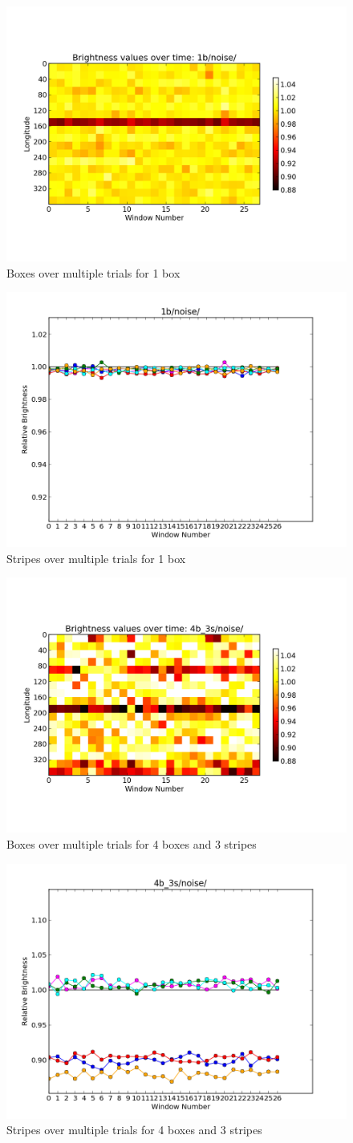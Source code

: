 \documentclass[iop]{emulateapj}
\begin{document}
\begin{figure}[h]
	\centering
	\includegraphics[width=.5\textwidth]{images/1b/noise/region_plot.png}
	\caption{Boxes over multiple trials for 1 box}
	\label{1b/noise}
\end{figure}
\begin{figure}[h]
	\centering
	\includegraphics[width=.5\textwidth]{images/1b/noise/stripes_over_time.png}
	\caption{Stripes over multiple trials for 1 box}
	\label{1b/noise/stripes}
\end{figure}

\begin{figure}[h]
	\centering
	\includegraphics[width=.5\textwidth]{images/4b_3s/noise/region_plot.png}
	\caption{Boxes over multiple trials for 4 boxes and 3 stripes}
	\label{4b_3s/noise}
\end{figure}
\begin{figure}[h]
	\centering
	\includegraphics[width=.5\textwidth]{images/4b_3s/noise/stripes_over_time.png}
	\caption{Stripes over multiple trials for 4 boxes and 3 stripes}
	\label{4b_3s/noise/stripes}
\end{figure}
\end{document}
